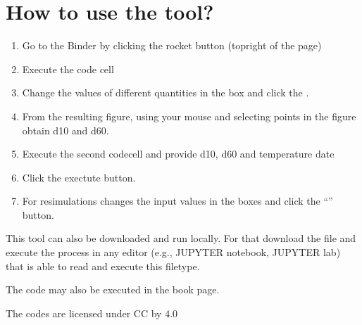 \documentclass[letterpaper,10pt,english]{jupyterBook}
\begin{document}
\section{How to use the tool?}
\label{\detokenize{content/tools/sieve_analysis:how-to-use-the-tool}}\begin{enumerate}
%
\item {} 
\sphinxAtStartPar
Go to the Binder by clicking the rocket button (top\sphinxhyphen{}right of the page)

\item {} 
\sphinxAtStartPar
Execute the code cell

\item {} 
\sphinxAtStartPar
Change the values of different quantities in the box and click the .

\item {} 
\sphinxAtStartPar
From the resulting figure, using your mouse and selecting points in the figure obtain d10 and d60.

\item {} 
\sphinxAtStartPar
Execute the second code\sphinxhyphen{}cell and provide d10, d60 and temperature date

\item {} 
\sphinxAtStartPar
Click the exectute button.

\item {} 
\sphinxAtStartPar
For re\sphinxhyphen{}simulations \sphinxhyphen{} changes the input values in the boxes and click the “” button.

\end{enumerate}

\sphinxAtStartPar
This tool can also be downloaded and run locally. For that download the  file and execute the process in any editor (e.g., JUPYTER notebook, JUPYTER lab) that is able to read and execute this file\sphinxhyphen{}type.

\sphinxAtStartPar
The code may also be executed in the book page.

\sphinxAtStartPar
The codes are licensed under CC by 4.0 
\end{document}

